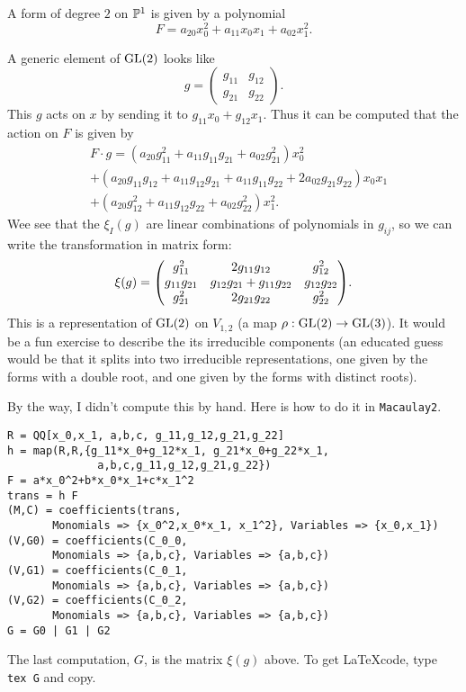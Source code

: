 \documentclass[11pt, english]{article}
\begin{document}
\begin{example}[Pairs of points on the Riemann sphere, $d=2$, $n=2$]
A form of degree $2$ on $\mathbb{P}^1$ is given by a polynomial $$F=a_{20}x_0^2 + a_{11}x_0x_1+a_{02}x_1^2.$$

A generic element of $\operatorname{GL}(2)$ looks like
$$
g = \begin{pmatrix} g_{11} & g_{12} \\
g_{21} & g_{22}
\end{pmatrix}.
$$
This $g$ acts on $x$ by sending it to $g_{11}x_0+g_{12}x_1$. Thus it can be computed that the action on $F$ is given by
\begin{align*}
& F \cdot g = (a_{20} {g}_{11}^{2}+a_{11} {g}_{11} {g}_{21}+a_{02} {g}_{21}^{2} )x_0^2 \\
&+ (a_{20} {g}_{11} {g}_{12}+a_{11} {g}_{12} {g}_{21}+a_{11} {g}_{11} {g}_{22}+2 a_{02}
      {g}_{21} {g}_{22})x_0x_1 \\
&+  (a_{20} {g}_{12}^{2}+a_{11} {g}_{12} {g}_{22}+a_{02} {g}_{22}^{2})x_1^2.
\end{align*}
Wee see that the $\xi_I(g)$ are linear combinations of polynomials in $g_{ij}$, so we can write the transformation in matrix form:
$$ \xi(g) = 
\bgroup\begin{pmatrix}{g}_{11}^{2}&
      2 {g}_{11} {g}_{12}&
      {g}_{12}^{2}\\
      {g}_{11} {g}_{21}&
      {g}_{12} {g}_{21}+{g}_{11} {g}_{22}&
      {g}_{12} {g}_{22}\\
      {g}_{21}^{2}&
      2 {g}_{21} {g}_{22}&
      {g}_{22}^{2}\\
      \end{pmatrix}\egroup.
$$
This is a representation of $\operatorname{GL}(2)$ on $V_{1,2}$ (a map $\rho:\operatorname{GL}(2) \to \operatorname{GL}(3)$). It would be a fun exercise to describe the its irreducible components (an educated guess would be that it splits into two irreducible representations, one given by the forms with a double root, and one given by the forms with distinct roots).

By the way, I didn't compute this by hand. Here is how to do it in \verb|Macaulay2|.
\begin{verbatim}
R = QQ[x_0,x_1, a,b,c, g_11,g_12,g_21,g_22]
h = map(R,R,{g_11*x_0+g_12*x_1, g_21*x_0+g_22*x_1,
              a,b,c,g_11,g_12,g_21,g_22})
F = a*x_0^2+b*x_0*x_1+c*x_1^2
trans = h F
(M,C) = coefficients(trans,
       Monomials => {x_0^2,x_0*x_1, x_1^2}, Variables => {x_0,x_1})
(V,G0) = coefficients(C_0_0,
       Monomials => {a,b,c}, Variables => {a,b,c})
(V,G1) = coefficients(C_0_1,
       Monomials => {a,b,c}, Variables => {a,b,c})
(V,G2) = coefficients(C_0_2,
       Monomials => {a,b,c}, Variables => {a,b,c})
G = G0 | G1 | G2
\end{verbatim}
The last computation, $G$, is the matrix $\xi(g)$ above. To get \LaTeX code, type \verb|tex G| and copy.
\end{example}
\end{document}
